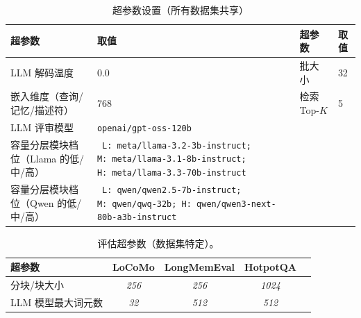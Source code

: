 
\begin{table}[htbp]
    \centering
    \caption{超参数设置（所有数据集共享）}
    \label{tab:hparams_shared}
    \begin{tabularx}{0.95\textwidth}{@{}lX lX@{}}
        \toprule
        \textbf{超参数} & \textbf{取值} & \textbf{超参数} & \textbf{取值} \\
        \midrule
        LLM 解码温度 & 0.0 & 批大小 & 32 \\
        嵌入维度（查询/记忆/描述符） & 768  & 检索 Top-$K$ & 5\\
         LLM 评审模型 & \texttt{\small openai/gpt-oss-120b} \\
        容量分层模块档位（Llama 的\textsc{低}/\textsc{中}/\textsc{高}） &
{\raggedright\texttt{\small
L:\nobreak\ meta/llama-3.2-3b-instruct;\;
M:\nobreak\ meta/llama-3.1-8b-instruct;\;
H:\nobreak\ meta/llama-3.3-70b-instruct
}\par}  \\
容量分层模块档位（Qwen 的\textsc{低}/\textsc{中}/\textsc{高}） &
{\raggedright\texttt{\small
L:\nobreak\ qwen/qwen2.5-7b-instruct;\;
M:\nobreak\ qwen/qwq-32b;\;
H:\nobreak\ qwen/qwen3-next-80b-a3b-instruct
}\par}  \\
        \bottomrule
    \end{tabularx}
\end{table}




\begin{table}[htbp]
    \centering
    \caption{评估超参数（数据集特定）。}
    \label{tab:hparams_eval}
        \begin{tabular}{lcccc}
        \toprule
        \textbf{超参数} & \textbf{LoCoMo} & \textbf{LongMemEval} & \textbf{HotpotQA} & \\
        \midrule
        分块/块大小 & \textit{256} & \textit{256} & \textit{1024}  \\
        LLM 模型最大词元数 & \textit{32} & \textit{512} & \textit{512}  \\
        \bottomrule
        \end{tabular}
\end{table}
